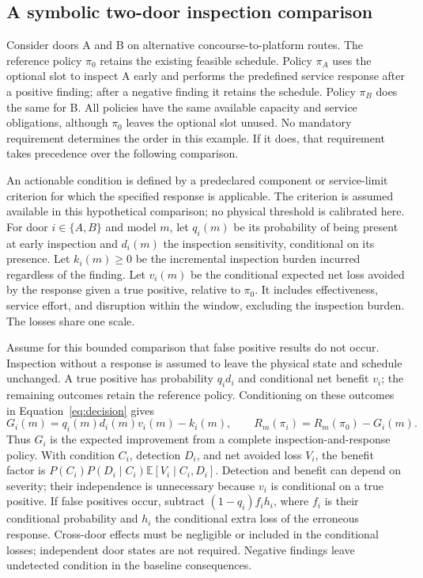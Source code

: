 \documentclass[symmetry,article,submit,pdftex,oneauthor]{Definitions/mdpi}
\begin{document}
\subsection{A symbolic two-door inspection comparison}
\label{sec:outputs}

Consider doors A and B on alternative concourse-to-platform routes. The reference policy $\pi_0$ retains the existing feasible schedule. Policy $\pi_A$ uses the optional slot to inspect A early and performs the predefined service response after a positive finding; after a negative finding it retains the schedule. Policy $\pi_B$ does the same for B. All policies have the same available capacity and service obligations, although $\pi_0$ leaves the optional slot unused. No mandatory requirement determines the order in this example. If it does, that requirement takes precedence over the following comparison.

An actionable condition is defined by a predeclared component or service-limit criterion for which the specified response is applicable. The criterion is assumed available in this hypothetical comparison; no physical threshold is calibrated here. For door $i\in\{A,B\}$ and model $m$, let $q_i(m)$ be its probability of being present at early inspection and $d_i(m)$ the inspection sensitivity, conditional on its presence. Let $k_i(m)\geq0$ be the incremental inspection burden incurred regardless of the finding. Let $v_i(m)$ be the conditional expected net loss avoided by the response given a true positive, relative to $\pi_0$. It includes effectiveness, service effort, and disruption within the window, excluding the inspection burden. The losses share one scale.

Assume for this bounded comparison that false positive results do not occur. Inspection without a response is assumed to leave the physical state and schedule unchanged. A true positive has probability $q_i d_i$ and conditional net benefit $v_i$; the remaining outcomes retain the reference policy. Conditioning on these outcomes in Equation~\ref{eq:decision} gives
\begin{equation}
G_i(m)=q_i(m)d_i(m)v_i(m)-k_i(m),
\qquad R_m(\pi_i)=R_m(\pi_0)-G_i(m).
\label{eq:inspection-gain}
\end{equation}
Thus $G_i$ is the expected improvement from a complete inspection-and-response policy. With condition $C_i$, detection $D_i$, and net avoided loss $V_i$, the benefit factor is \mbox{$P(C_i)P(D_i\mid C_i)\mathbb E[V_i\mid C_i,D_i]$}. Detection and benefit can depend on severity; their independence is unnecessary because $v_i$ is conditional on a true positive. If false positives occur, subtract $(1-q_i)f_i h_i$, where $f_i$ is their conditional probability and $h_i$ the conditional extra loss of the erroneous response. Cross-door effects must be negligible or included in the conditional losses; independent door states are not required. Negative findings leave undetected condition in the baseline consequences.
\end{document}

